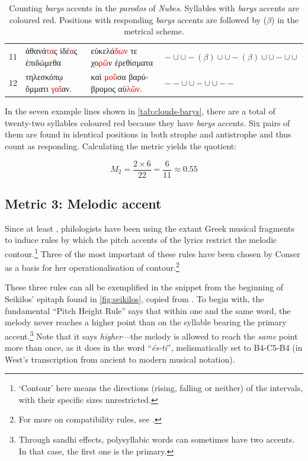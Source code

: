 \documentclass[twoside]{article}
\newcommand{\longa}{-}        %
\newcommand{\brevis}{\cup}    %
\begin{document}
\begin{table}[ht]
{\begin{tabular}{c l l l}
            11 &
            \textgreek{ἀθανά\textcolor{red}{τα}ς ἰδέ\textcolor{red}{α}ς ἐπιδώμεθα} &
            \textgreek{εὐκελά\textcolor{red}{δων} τε χο\textcolor{red}{ρῶ}ν ἐρεθίσματα} &
            $\longa\brevis\brevis\longa(\beta)\brevis\brevis\longa(\beta)\brevis\brevis\longa\brevis\brevis$ \\
            
            12 &
            \textgreek{τηλεσκόπῳ ὄμματι \textcolor{red}{γαῖ}αν.} &
            \textgreek{καὶ \textcolor{red}{μοῦ}σα βαρύβρομος αὐ\textcolor{red}{λῶν}.} &
            $\longa\longa\brevis\brevis\longa\brevis\brevis\longa\longa$ \\
            \hline
        \end{tabular}
    }
    \caption{Counting \textit{barys} accents in the \textit{parodos} of \textit{Nubes}. Syllables with \textit{barys} accents are coloured red. Positions with responding \textit{barys} accents are followed by ($\beta$) in the metrical scheme.}
    \label{tab:clouds-barys}
\end{table}

In the seven example lines shown in \autoref{tab:clouds-barys}, there are a total of twenty-two syllables coloured red because they have \textit{barys} accents. Six pairs of them are found in identical positions in both strophe and antistrophe and thus count as responding. Calculating the metric yields the quotient:

\[
M_2 = \frac{2 \times 6}{22} = \frac{6}{11} \approx 0.55
\]

\subsection{Metric 3: Melodic accent}\label{sec:mel}

Since at least \textcite{crusiusNeuentdektenAntikenMusikresten1883}, philologists have been using the extant Greek musical fragments to induce rules by which the pitch accents of the lyrics restrict the melodic contour.\footnote{`Contour' here means the directions (rising, falling or neither) of the intervals, with their specific sizes unrestricted.} Three of the most important of these rules have been chosen by Conser as a basis for her operationalisation of contour.\footnote{For more on compatibility rules, see \textcite{cosgroveMelodyWordAccent2006}.}

These three rules can all be exemplified in the snippet from the beginning of Seikilos' epitaph found in \autoref{fig:seikilos}, copied from \textcite{westAncientGreekMusic1994}. To begin with, the fundamental ``Pitch Height Rule'' says that within one and the same word, the melody never reaches a higher point than on the syllable bearing the primary accent.\footnote{Through sandhi effects, polysyllabic words can sometimes have two accents. In that case, the first one is the primary.} Note that it says \textit{higher}—the melody is allowed to reach the \textit{same} point more than once, as it does in the word ``\textit{és-ti}'', melismatically set to B4-C5-B4 (in West's transcription from ancient to modern musical notation).
\end{document}
